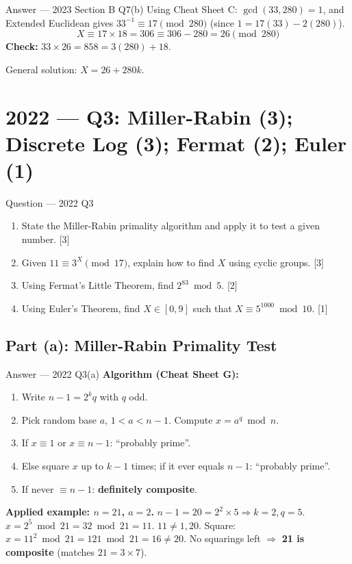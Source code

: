 \documentclass[12pt,a4paper]{article}
\begin{document}
\begin{solbox}{Answer --- 2023 Section B Q7(b)}
Using Cheat Sheet C: $\gcd(33,280)=1$, and Extended Euclidean gives $33^{-1}\equiv17\pmod{280}$ (since $1=17(33)-2(280)$).
\[
X \equiv 17 \times 18 = 306 \equiv 306-280 = \boxed{26} \pmod{280}
\]
\textbf{Check:} $33\times26=858=3(280)+18$. \checkmark

General solution: $X = 26+280k$.
\end{solbox}

\newpage
\section{2022 --- Q3: Miller-Rabin (3); Discrete Log (3); Fermat (2); Euler (1)}

\begin{qbox}{Question --- 2022 Q3}
\begin{enumerate}[label=(\alph*)]
  \item State the Miller-Rabin primality algorithm and apply it to test a given number. \hfill [3]
  \item Given $11 \equiv 3^X \pmod{17}$, explain how to find $X$ using cyclic groups. \hfill [3]
  \item Using Fermat's Little Theorem, find $2^{83} \bmod 5$. \hfill [2]
  \item Using Euler's Theorem, find $X \in [0,9]$ such that $X \equiv 5^{1000} \bmod 10$. \hfill [1]
\end{enumerate}
\end{qbox}

\subsection{Part (a): Miller-Rabin Primality Test}
\begin{solbox}{Answer --- 2022 Q3(a)}
\textbf{Algorithm (Cheat Sheet G):}
\begin{enumerate}[noitemsep]
  \item Write $n-1=2^k q$ with $q$ odd.
  \item Pick random base $a$, $1<a<n-1$. Compute $x=a^q\bmod n$.
  \item If $x\equiv1$ or $x\equiv n-1$: ``probably prime''.
  \item Else square $x$ up to $k-1$ times; if it ever equals $n-1$: ``probably prime''.
  \item If never $\equiv n-1$: \textbf{definitely composite}.
\end{enumerate}
\textbf{Applied example: $n=21$, $a=2$.} $n-1=20=2^2\times5 \Rightarrow k=2,q=5$.
$x=2^5\bmod21=32\bmod21=11$. $11\neq1,20$. Square: $x=11^2\bmod21=121\bmod21=16\neq20$. No squarings left $\Rightarrow$ \textbf{21 is composite} (matches $21=3\times7$).
\end{solbox}
\end{document}
